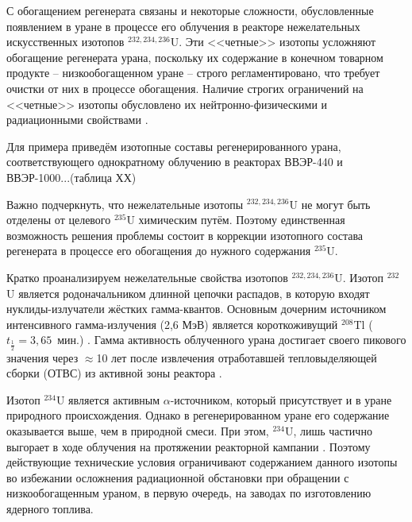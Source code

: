 С обогащением регенерата связаны и некоторые сложности, обусловленные появлением в уране в процессе его облучения в реакторе нежелательных искусственных изотопов $^{232,234,236}$U. Эти <<четные>> изотопы усложняют обогащение регенерата урана, поскольку их содержание в конечном товарном продукте -- низкообогащенном уране -- строго регламентировано, что требует очистки от них в процессе обогащения.
Наличие строгих ограничений на <<четные>> изотопы обусловлено их нейтронно-физическими и радиационными свойствами \cite{smirnovEvolutionIsotopicComposition2012, proselkovAnalizVozmozhnostiIspolzovaniya2003, dudnikovInfluence236UEfficacy2016}.

Для примера приведём изотопные составы регенерированного урана, соответствующего однократному облучению в реакторах ВВЭР-440 и ВВЭР-1000...(таблица ХХ)


Важно подчеркнуть, что нежелательные изотопы $^{232,234,236}$U не могут быть отделены от целевого $^{235}$U химическим путём. Поэтому единственная возможность решения проблемы состоит в коррекции изотопного состава регенерата в процессе его обогащения до нужного содержания $^{235}$U. 

Кратко проанализируем нежелательные свойства изотопов $^{232,234,236}$U. Изотоп $^{232}$U является родоначальником длинной цепочки распадов, в которую входят нуклиды-излучатели жёстких гамма-квантов.
Основным дочерним источником интенсивного гамма-излучения (2,6 МэВ) является короткоживущий $^{208}$Tl ($t_{\frac{1}{2}}=3,65$ мин.) \cite{matveevUran232EgoVliyanie1985,abbasProliferationResistanceFeatures2013}. Гамма активность облученного урана достигает своего пикового значения через $\approx$10 лет после извлечения отработавшей тепловыделяющей сборки (ОТВС) из активной зоны реактора \cite{gresleyEnrichingRecyclingUranium1988}.

Изотоп $^{234}$U является активным $\alpha$-источником, который присутствует и в уране природного происхождения. Однако в регенерированном уране его содержание оказывается выше, чем в природной смеси. При этом, $^{234}$U, лишь частично выгорает в ходе облучения на протяжении реакторной кампании \cite{gresleyEnrichingRecyclingUranium1988}. Поэтому действующие технические условия ограничивают содержанием данного изотопы во избежании осложнения радиационной обстановки при обращении с низкообогащенным ураном, в первую очередь, на заводах по изготовлению ядерного топлива.

